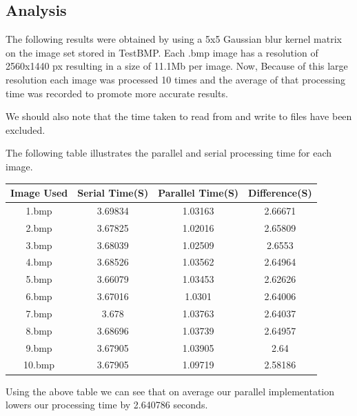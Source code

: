 \documentclass[paper=a4, fontsize=11pt]{scrartcl} %
\numberwithin{equation}{section} %
\numberwithin{figure}{section} %
\numberwithin{table}{section} %
\begin{document}
\subsection{Analysis}
The following results were obtained by using a 5x5 Gaussian blur kernel matrix on the image set stored in TestBMP.
Each .bmp image has a resolution of 2560x1440 px resulting in a size of 11.1Mb per image. Now, Because of this large resolution each image was processed 10 times and the average of that processing time was recorded to promote more accurate results.


We should also note that the time taken to read from and write to files have been excluded.


The following table illustrates the parallel and serial processing time for each image.

\begin{center}

\begin{tabular}{||c |c |c |c ||}
\hline
\textbf{Image Used} & \textbf{Serial Time(S)} & \textbf{Parallel Time(S)} & \textbf{Difference(S)} \\[0.5ex]
\hline \hline

1.bmp & 3.69834 & 1.03163 & 2.66671 \\
2.bmp & 3.67825 & 1.02016 & 2.65809\\
3.bmp & 3.68039 & 1.02509 & 2.6553\\
4.bmp & 3.68526 & 1.03562 & 2.64964\\
5.bmp & 3.66079 & 1.03453 & 2.62626\\
6.bmp & 3.67016 & 1.0301 & 2.64006\\
7.bmp & 3.678 & 1.03763 & 2.64037\\
8.bmp & 3.68696 & 1.03739  & 2.64957\\
9.bmp & 3.67905 & 1.03905 & 2.64\\
10.bmp & 3.67905 & 1.09719 & 2.58186\\[1ex]

\hline

\end{tabular}

\end{center}

Using the above table we can see that on average our parallel implementation lowers our processing time by 2.640786 seconds.
\end{document}
